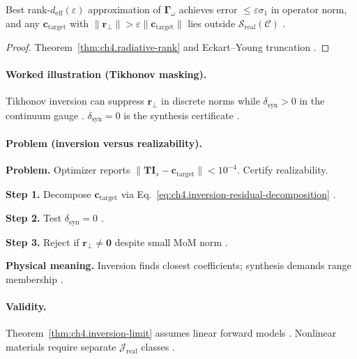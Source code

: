 \begin{theorem}
\label{thm:ch4.inversion-limit}
Best rank-\(d_{\mathrm{eff}}(\varepsilon)\) approximation of \(\boldsymbol{\Gamma}_\omega\) achieves error
\(\le\varepsilon\sigma_{1}\) in operator norm, and any \(\mathbf{c}_{\mathrm{target}}\) with
\(\|\mathbf{r}_{\perp}\|>\varepsilon\|\mathbf{c}_{\mathrm{target}}\|\) lies outside \(\mathcal{S}_{\mathrm{real}}(\mathcal{C})\)
\cite{stratton1941,harrington2001,devaney2004,hansen1988}.
\end{theorem}
\begin{proof}
Theorem~\ref{thm:ch4.radiative-rank} and Eckart--Young truncation \cite{harrington2001,stratton1941}.
\end{proof}

\paragraph{Worked illustration (Tikhonov masking).}
Tikhonov inversion can suppress \(\mathbf{r}_{\perp}\) in discrete norms while \(\delta_{\mathrm{syn}}>0\) in the continuum gauge
\cite{harrington2001,devaney2004}. \(\delta_{\mathrm{syn}}=0\) is the synthesis certificate \cite{stratton1941}.

\paragraph{Problem (inversion versus realizability).}
\textbf{Problem.} Optimizer reports \(\|\mathbf{T}\mathbf{I}_{s}-\mathbf{c}_{\mathrm{target}}\|<10^{-4}\). Certify realizability.

\textbf{Step 1.} Decompose \(\mathbf{c}_{\mathrm{target}}\) via Eq.~\eqref{eq:ch4.inversion-residual-decomposition} \cite{stratton1941}.

\textbf{Step 2.} Test \(\delta_{\mathrm{syn}}=0\) \cite{harrington2001,devaney2004}.

\textbf{Step 3.} Reject if \(\mathbf{r}_{\perp}\neq\mathbf{0}\) despite small MoM norm \cite{hansen1988}.

\textbf{Physical meaning.} Inversion finds closest coefficients; synthesis demands range membership \cite{stratton1941}.

\paragraph{Validity.}
Theorem~\ref{thm:ch4.inversion-limit} assumes linear forward models \cite{stratton1941}. Nonlinear materials require separate
\(\mathcal{J}_{\mathrm{real}}\) classes \cite{harrington2001}.


